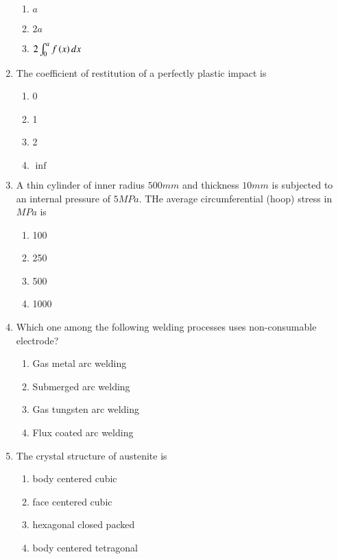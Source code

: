 \documentclass[journal]{IEEEtran}
\begin{document}
\begin{enumerate}
\begin{enumerate}
			\item $a$
			\item $2a$
			\item $2 \int_{0}^{a} f\left(x\right) dx$
		\end{enumerate}
	\item
	The coefficient of restitution of a perfectly plastic impact is
		\begin{enumerate}
			\item 0
			\item 1
			\item 2
			\item $\inf$
		\end{enumerate}
	\item
	A thin cylinder of inner radius $500 mm$ and thickness $10 mm$ is subjected to an internal pressure of $5 MPa$. THe average circumferential (hoop) stress in $MPa$ is
		\begin{enumerate}
			\item 100
			\item 250
			\item 500
			\item 1000
		\end{enumerate}
	\item
	Which one among the following welding processes uses non-consumable electrode?
		\begin{enumerate}
			\item Gas metal arc welding
			\item Submerged arc welding
			\item Gas tungsten arc welding
			\item Flux coated arc welding
		\end{enumerate}
	\item
	The crystal structure of austenite is
		\begin{enumerate}
			\item body centered cubic
			\item face centered cubic
			\item hexagonal closed packed
			\item body centered tetragonal
		\end{enumerate}
\end{enumerate}
\end{document}
